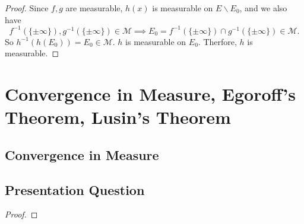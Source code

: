 \documentclass[class=book, crop=false]{standalone}
\begin{document}
        \begin{proof}
            Since $f, g$ are measurable, $h(x)$ is measurable on $E \backslash E_0$, and we also have
            \begin{equation*}
                f^{-1}(\{\pm \infty\}), g^{-1}(\{\pm\infty\}) \in \mathcal{M} \implies E_0 = f^{-1}(\{\pm \infty\}) \cap g^{-1}(\{\pm\infty\}) \in \mathcal{M}.
            \end{equation*}
            So $h^{-1}(h(E_0)) = E_0 \in \mathcal{M}$. $h$ is measurable on $E_0$. Therfore, $h$ is measurable.
        \end{proof}


    \section{Convergence in Measure, Egoroff’s Theorem, Lusin’s Theorem}
        \subsection{Convergence in Measure}
        
        
        \subsection{Presentation Question}
        \begin{question}
            
        \end{question}
        \begin{proof}
            
        \end{proof}
\end{document}
